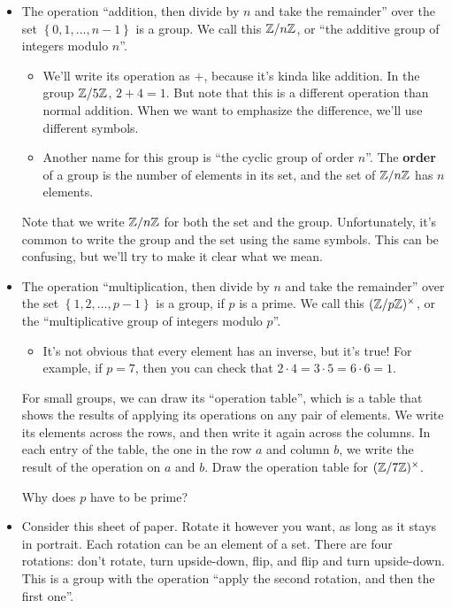 \documentclass[11pt,paper=letter]{scrartcl}
\renewcommand{\bluebf}[1]{{\bfseries \color{Blue} #1}}
\begin{document}
\begin{itemize}
  \item The operation ``addition, then divide by $n$ and take the remainder'' over the set $ \left\{ 0, 1, \ldots, n - 1 \right\} $ is a group. We call this $\mathbb Z/n\mathbb Z$, or ``the additive group of integers modulo $n$''.
  \begin{itemize}
    \item We'll write its operation as $+$, because it's kinda like addition. In the group $\mathbb Z/5\mathbb Z$, $2 + 4 = 1$. But note that this is a different operation than normal addition. When we want to emphasize the difference, we'll use different symbols.
    \item Another name for this group is ``the cyclic group of order $n$''. The \bluebf{order} of a group is the number of elements in its set, and the set of $\mathbb Z/n\mathbb Z$ has $n$ elements.
  \end{itemize}
  \begin{remboxed}
    Note that we write $\mathbb Z/n\mathbb Z$ for both the set and the group. Unfortunately, it's common to write the group and the set using the same symbols. This can be confusing, but we'll try to make it clear what we mean.
  \end{remboxed}
  \item The operation ``multiplication, then divide by $n$ and take the remainder'' over the set $ \left\{ 1, 2, \ldots, p - 1 \right\} $ is a group, if $p$ is a prime. We call this $(\mathbb Z/p\mathbb Z)^\times$, or the ``multiplicative group of integers modulo $p$''.
  \begin{itemize}
    \item It's not obvious that every element has an inverse, but it's true! For example, if $p = 7$, then you can check that $ 2 \cdot 4 = 3 \cdot 5 = 6 \cdot 6 = 1$.
  \end{itemize}
  \begin{exrboxed}
    For small groups, we can draw its ``operation table'', which is a table that shows the results of applying its operations on any pair of elements. We write its elements across the rows, and then write it again across the columns. In each entry of the table, the one in the row $a$ and column $b$, we write the result of the operation on $a$ and $b$. Draw the operation table for $(\mathbb Z/7\mathbb Z)^\times$.
  \end{exrboxed}
  \begin{exrboxed}
    Why does $p$ have to be prime?
  \end{exrboxed}
  \item Consider this sheet of paper. Rotate it however you want, as long as it stays in portrait. Each rotation can be an element of a set. There are four rotations: don't rotate, turn upside-down, flip, and flip and turn upside-down. This is a group with the operation ``apply the second rotation, and then the first one''.

\end{itemize}
\end{document}

